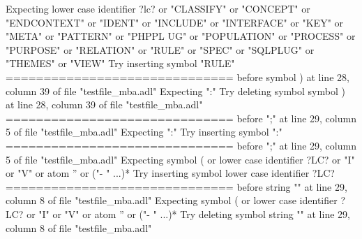 {  Expecting lower case identifier ?lc? or "CLASSIFY" or "CONCEPT" or "ENDCONTEXT"\newline
  or "IDENT" or "INCLUDE" or "INTERFACE" or "KEY" or "META" or "PATTERN" or "PHPPL\newline
  UG" or "POPULATION" or "PROCESS" or "PURPOSE" or "RELATION" or "RULE" or "SPEC"\newline
  or "SQLPLUG" or "THEMES" or "VIEW"\newline
  Try inserting symbol "RULE"\newline
  \newline
  ==============================\newline
  \newline
  before symbol ) at line 28, column 39 of file "testfile\_mba.adl"\newline
  Expecting ":"\newline
  Try deleting symbol symbol ) at line 28, column 39 of file "testfile\_mba.adl"\newline
  \newline
  ==============================\newline
  \newline
  before ";" at line 29, column 5 of file "testfile\_mba.adl"\newline
  Expecting ":"\newline
  Try inserting symbol ":"\newline
  \newline
  ==============================\newline
  \newline
  before ";" at line 29, column 5 of file "testfile\_mba.adl"\newline
  Expecting symbol ( or lower case identifier ?LC? or "I" or "V" or atom '' or ("-\newline
  " ...)*\newline
  Try inserting symbol lower case identifier ?LC?\newline
  \newline
  ==============================\newline
  \newline
  before string "" at line 29, column 8 of file "testfile\_mba.adl"\newline
  Expecting symbol ( or lower case identifier ?LC? or "I" or "V" or atom '' or ("-\newline
  " ...)*\newline
  Try deleting symbol string "" at line 29, column 8 of file "testfile\_mba.adl"\newline
}
